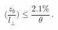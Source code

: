 \begin{equation}
\biggr(\frac{z_{b}}{l_{\perp}}\biggr)\leq \frac {2.1\%}{\theta} \, .
\end{equation}

